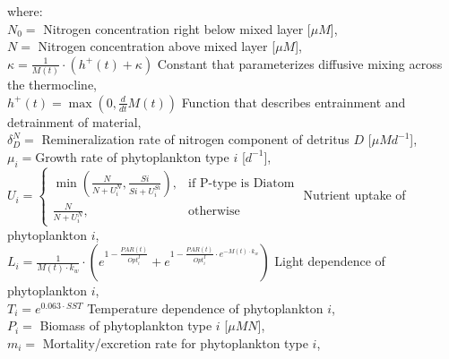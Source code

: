 \documentclass[11pt,letterpaper,english]{article}
\begin{document}
where:\\
\mbox{} \hspace{.5cm} $N_0=$ Nitrogen concentration right below mixed layer [$\mu M$],\\
\mbox{} \hspace{.5cm} $N=$ Nitrogen concentration above mixed layer [$\mu M$],\\
\mbox{} \hspace{.5cm} $\kappa = \frac{1}{M(t)} \cdot \left(h^{+}(t) + \kappa\right)$ Constant that parameterizes diffusive mixing across the thermocline, \\
\mbox{} \hspace{.5cm} $h^{+}(t) = \max\left(0, \frac{d}{d t} M(t)\right)$ Function that describes entrainment and detrainment of material,\\
\mbox{} \hspace{.5cm} $\delta^N_D=$ Remineralization rate of nitrogen component of detritus $D$ [$\mu M d^{-1}$],\\
\mbox{} \hspace{.5cm} $\mu_i=$Growth rate of phytoplankton type $i$ [$d^{-1}$],\\


\mbox{} \hspace{.5cm} $U_i=\begin{cases}\min\left(\frac{N}{N + U^{N}_i}, \frac{Si}{Si + U^{Si}_i}\right),& \text{if P-type is Diatom}\\\frac{N}{N + U^{N}_i}, & \text{otherwise}\end{cases}$ Nutrient uptake of phytoplankton $i$,\\

\mbox{} \hspace{.5cm} $L_i=\frac{1}{M(t) \cdot k_{w}} \cdot \left(e^{1 - \frac{PAR(t)}{Opt^{I}_i}} + e^{1 - \frac{PAR(t)}{Opt^{I}_i} \cdot e^{- M(t) \cdot k_{w}}}\right)$ Light dependence of  phytoplankton $i$,\\
\mbox{} \hspace{.5cm} $T_i= e^{0.063 \cdot SST}$ Temperature dependence of phytoplankton $i$,\\

\mbox{} \hspace{.5cm} $P_i=$ Biomass of phytoplankton type $i$ [$\mu M N$],\\
\mbox{} \hspace{.5cm} $m_i=$ Mortality/excretion rate for phytoplankton type $i$,\\
\end{document}
